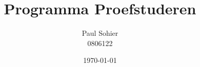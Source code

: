 \documentclass[a4paper,11pt]{report}
\begin{document}
\title{
  Programma Proefstuderen
}
\author{
  Paul Sohier\\
  0806122
}
\date{\today}
\maketitle




%
%
%
%

%

%

\end{document}
